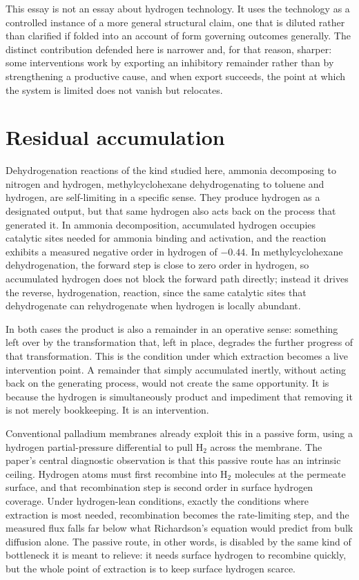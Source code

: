 \documentclass[11pt]{article}
\begin{document}
This essay is not an essay about hydrogen technology. It uses the technology as a controlled instance of a more general structural claim, one that is diluted rather than clarified if folded into an account of form governing outcomes generally. The distinct contribution defended here is narrower and, for that reason, sharper: some interventions work by exporting an inhibitory remainder rather than by strengthening a productive cause, and when export succeeds, the point at which the system is limited does not vanish but relocates.

\section{Residual accumulation}

Dehydrogenation reactions of the kind studied here, ammonia decomposing to nitrogen and hydrogen, methylcyclohexane dehydrogenating to toluene and hydrogen, are self-limiting in a specific sense. They produce hydrogen as a designated output, but that same hydrogen also acts back on the process that generated it. In ammonia decomposition, accumulated hydrogen occupies catalytic sites needed for ammonia binding and activation, and the reaction exhibits a measured negative order in hydrogen of $-0.44$. In methylcyclohexane dehydrogenation, the forward step is close to zero order in hydrogen, so accumulated hydrogen does not block the forward path directly; instead it drives the reverse, hydrogenation, reaction, since the same catalytic sites that dehydrogenate can rehydrogenate when hydrogen is locally abundant.

In both cases the product is also a remainder in an operative sense: something left over by the transformation that, left in place, degrades the further progress of that transformation. This is the condition under which extraction becomes a live intervention point. A remainder that simply accumulated inertly, without acting back on the generating process, would not create the same opportunity. It is because the hydrogen is simultaneously product and impediment that removing it is not merely bookkeeping. It is an intervention.

Conventional palladium membranes already exploit this in a passive form, using a hydrogen partial-pressure differential to pull H$_2$ across the membrane. The paper's central diagnostic observation is that this passive route has an intrinsic ceiling. Hydrogen atoms must first recombine into H$_2$ molecules at the permeate surface, and that recombination step is second order in surface hydrogen coverage. Under hydrogen-lean conditions, exactly the conditions where extraction is most needed, recombination becomes the rate-limiting step, and the measured flux falls far below what Richardson's equation would predict from bulk diffusion alone. The passive route, in other words, is disabled by the same kind of bottleneck it is meant to relieve: it needs surface hydrogen to recombine quickly, but the whole point of extraction is to keep surface hydrogen scarce.
\end{document}
